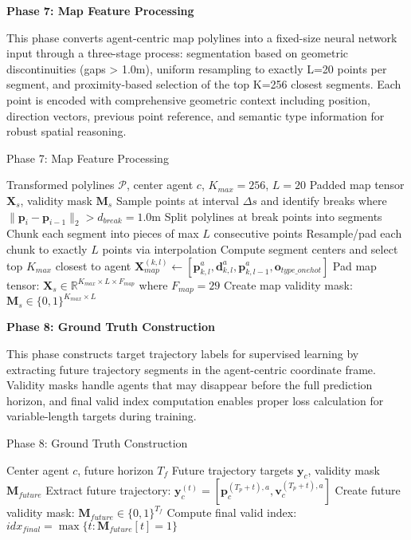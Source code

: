 \textbf{Phase 7: Map Feature Processing}

This phase converts agent-centric map polylines into a fixed-size neural network input through a three-stage process: segmentation based on geometric discontinuities (gaps > 1.0m), uniform resampling to exactly L=20 points per segment, and proximity-based selection of the top K=256 closest segments. Each point is encoded with comprehensive geometric context including position, direction vectors, previous point reference, and semantic type information for robust spatial reasoning.

\begin{algorithm}[H]
\caption{Phase 7: Map Feature Processing}
\label{alg:phase7_map_features}
\begin{algorithmic}[1]
\REQUIRE Transformed polylines $\mathcal{P}$, center agent $c$, $K_{max} = 256$, $L = 20$
\ENSURE Padded map tensor $\boldsymbol{X}_s$, validity mask $\boldsymbol{M}_s$
\STATE Sample points at interval $\Delta s$ and identify breaks where $\|\boldsymbol{p}_i - \boldsymbol{p}_{i-1}\|_2 > d_{break} = 1.0$m
\STATE Split polylines at break points into segments
\STATE Chunk each segment into pieces of max $L$ consecutive points
\STATE Resample/pad each chunk to exactly $L$ points via interpolation
\STATE Compute segment centers and select top $K_{max}$ closest to agent
    \STATE $\boldsymbol{X}_{map}^{(k,l)} \leftarrow [\boldsymbol{p}_{k,l}^a, \boldsymbol{d}_{k,l}^a, \boldsymbol{p}_{k,l-1}^a, \boldsymbol{o}_{type\_onehot}]$
\ENDFOR
\STATE Pad map tensor: $\boldsymbol{X}_s \in \mathbb{R}^{K_{max} \times L \times F_{map}}$ where $F_{map} = 29$
\STATE Create map validity mask: $\boldsymbol{M}_s \in \{0,1\}^{K_{max} \times L}$
\end{algorithmic}
\end{algorithm}

\textbf{Phase 8: Ground Truth Construction}

This phase constructs target trajectory labels for supervised learning by extracting future trajectory segments in the agent-centric coordinate frame. Validity masks handle agents that may disappear before the full prediction horizon, and final valid index computation enables proper loss calculation for variable-length targets during training.

\begin{algorithm}[H]
\caption{Phase 8: Ground Truth Construction}
\label{alg:phase8_ground_truth}
\begin{algorithmic}[1]
\REQUIRE Center agent $c$, future horizon $T_f$
\ENSURE Future trajectory targets $\boldsymbol{y}_c$, validity mask $\boldsymbol{M}_{future}$
    \STATE Extract future trajectory: $\boldsymbol{y}_c^{(t)} = [\boldsymbol{p}_c^{(T_p+t),a}, \boldsymbol{v}_c^{(T_p+t),a}]$
\ENDFOR
\STATE Create future validity mask: $\boldsymbol{M}_{future} \in \{0,1\}^{T_f}$
\STATE Compute final valid index: $idx_{final} = \max\{t : \boldsymbol{M}_{future}[t] = 1\}$
\end{algorithmic}
\end{algorithm}

